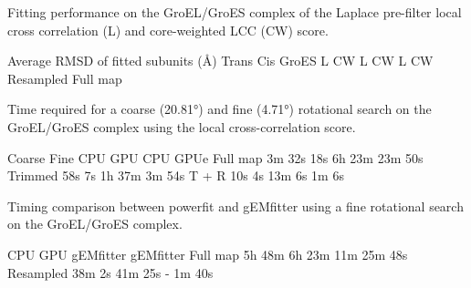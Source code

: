 \caption{}{Fitting performance on the GroEL/GroES complex of the Laplace
pre-filter local cross correlation (L) and core-weighted LCC (CW)
score.}
\stopbuffer

\setupTABLE[width=broad, align=middle, frame=off]
\setupTABLE[c][1][width=8em]
\setupTABLE[r][1, 4][topframe=on]
\setupTABLE[r][5][bottomframe=on]
\bTABLE[align=middle]
\bTABLEhead
\bTR \bTD[nr=3] \eTD \bTD[nc=6] Average RMSD of fitted subunits (Å) \eTD \eTR
\bTR \bTD[nc=2] Trans \eTD \bTD[nc=2] Cis \eTD \bTD[nc=2] GroES \eTD \eTR
\bTR \bTD L \eTD \bTD CW \eTD \bTD L \eTD \bTD CW \eTD \bTD L \eTD \bTD CW \eTD \eTR
\eTABLEhead
\bTABLEbody
\bTR \bTD Resampled \eTD {} \eTD {} \eTD {} \eTD {} \eTD {} \eTD {} \eTD \eTR
\bTR \bTD Full map \eTD {} \eTD {} \eTD {} \eTD {} \eTD {} \eTD {} \eTD \eTR
\eTABLEbody
\eTABLE
\stopbuffer


\caption{}
{Time required for a coarse (20.81°) and fine (4.71°) rotational search on the
GroEL/GroES complex using the local cross-correlation score.}
\stopbuffer

\setupTABLE[width=broad, frame=off]
\setupTABLE[r][1, 3][topframe=on]
\setupTABLE[r][5][bottomframe=on]
\bTABLE[align=middle]
\bTR \bTD[nr=2]  \eTD \bTD[nc=2] Coarse \eTD \bTD[nc=2] Fine \eTD \eTR
\bTR \bTD CPU \eTD \bTD GPU \eTD \bTD CPU \eTD \bTD  GPUe \eTD \eTR
\bTR \bTD Full map \eTD \bTD 3m 32s  \eTD \bTD 18s \eTD \bTD 6h 23m  \eTD \bTD 23m 50s \eTD \eTR
\bTR \bTD Trimmed  \eTD \bTD 58s     \eTD \bTD 7s  \eTD \bTD 1h 37m  \eTD \bTD 3m 54s  \eTD \eTR
\bTR \bTD T + R    \eTD \bTD 10s     \eTD \bTD 4s  \eTD \bTD 13m 6s  \eTD \bTD 1m 6s   \eTD \eTR
\eTABLE
\stopbuffer


\caption{}
{Timing comparison between powerfit and gEMfitter using a fine rotational search on the GroEL/GroES complex.}
\stopbuffer

\setupTABLE[width=broad, frame=off]
\setupTABLE[r][1, 3][topframe=on]
\setupTABLE[r][4][bottomframe=on]
\bTABLE[align=center]
\bTR \bTD \eTD \bTD[nc=2] CPU \eTD \bTD[nc=2] GPU \eTD \eTR
\bTR \bTD \eTD \bTD gEMfitter \eTD \bTD \powerfit \eTD \bTD gEMfitter \eTD \bTD \powerfit \eTD \eTR
\bTR \bTD Full map \eTD \bTD 5h 48m \eTD \bTD 6h 23m \eTD \bTD 11m \eTD \bTD 25m 48s \eTD \eTR
\bTR \bTD Resampled \eTD \bTD 38m 2s \eTD \bTD 41m 25s \eTD \bTD - \eTD \bTD 1m 40s \eTD \eTR
\eTABLE
\stopbuffer


